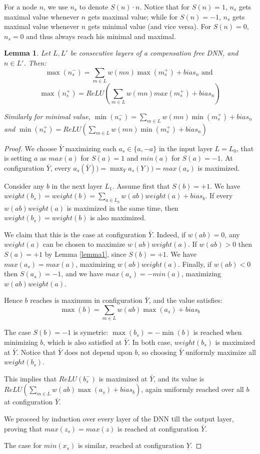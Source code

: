 \documentclass[]{article}
\newtheorem{lemma}{Lemma}
\theoremstyle{definition}
\begin{document}
For a node $n$, we use $n_s$ to denote $S(n)\cdot n$. 
Notice that for $S(n)=1$, $n_s$ gets maximal value whenever $n$ gets maximal value; 
while for $S(n)=-1$, $n_s$ gets maximal value whenever $n$ gets minimal value (and vice versa). For $S(n)=0$, $n_s=0$ and thus always reach his minimal and maximal.



\begin{lemma}
	\label{lemma2}
	Let $L,L'$ be consecutive layers of a compensation free DNN, and $n \in L'$. Then:
		$$ \max(n^-_s)=\sum_{m \in L}w(m n) \max(m^+_s)+bias_n \text{ and }$$
		$$\max(n^+_s)=ReLU(\sum_{m \in L}w(m n) max(m^+_s)+bias_n)$$

	
	
	Similarly  for minimal value,	
	$ \min(n^-_s)=\sum_{m \in L}w(m n)\min(m^+_s)+bias_n $ and
	$ \min(n^+_s)=ReLU(\sum_{m \in L}w(m n)\min(m^+_s)+bias_n)$
\end{lemma}

\begin{proof}
We choose $\bar{Y}$ maximizing each $a_s \in \{a,-a\}$ in the input layer $L=L_0$,
	that is setting $a$ as $max(a)$ for $S(a)=1$ and $min(a)$ for $S(a)=-1$.
At configuration $\bar{Y}$, every $a_s(\bar{Y}))=\max_Y {a_s(Y))}=max(a_s)$ is maximized.  

Consider any $b$ in the next layer $L_1$.
Assume first that $S(b)=+1$.
We have $weight(b_s)= weight(b) = \sum_{a \in L_0} w(a b) weight(a) + bias_b$.
If every $w(a b) weight(a)$ is maximized in the same time, 
then $weight(b_s)= weight(b)$ is also maximized. 

We claim that this is the case at 
configuration $\bar{Y}$.
Indeed, if $w(a b)=0$, any $weight(a)$ can be chosen to maximize 
$w(a b) weight(a)$. If $w(a b)>0$ then $S(a) = +1$ by Lemma \ref{lemma1}, since
$S(b)=+1$. We have $max(a_s) = max(a)$, maximizing $w(a b) weight(a)$.
Finally, if $w(a b)<0$ then $S(a_s) = -1$, and we have 
$max(a_s) = -min(a)$, maximizing $w(a b) weight(a)$.

Hence $b$ reaches is maximum in configuration $\bar{Y}$, and the value satisfies: 
$$\max(b)=\sum_{m \in L}w(a b) \max(a_s)+bias_b$$

The case $S(b)=-1$ is symetric:
$\max(b_s)= -\min(b)$ is reached when minimizing $b$, which is also 
satisfied at $\bar{Y}$.
In both case, $weight(b_s)$ is maximized at $\bar{Y}$. Notice that $\bar{Y}$ does not depend upon $b$, so choosing $\bar{Y}$ uniformly maximize all $weight(b_s)$.

This implies that $ReLU(b^-_s)$ is maximized at $\bar{Y}$, and its value is 
$ReLU(\sum_{m \in L}w(a b) \max(a_s)+bias_b)$, again uniformly reached over all $b$ at configuration $\bar{Y}$.

We proceed by induction over every layer of the DNN till the output layer, proving that 
$max(z_s)=max(z)$ is reached at configuration $\bar{Y}$.

The case for $min(x_s)$ is similar, reached at configuration $\underline{Y}$.
\end{proof}
\end{document}
